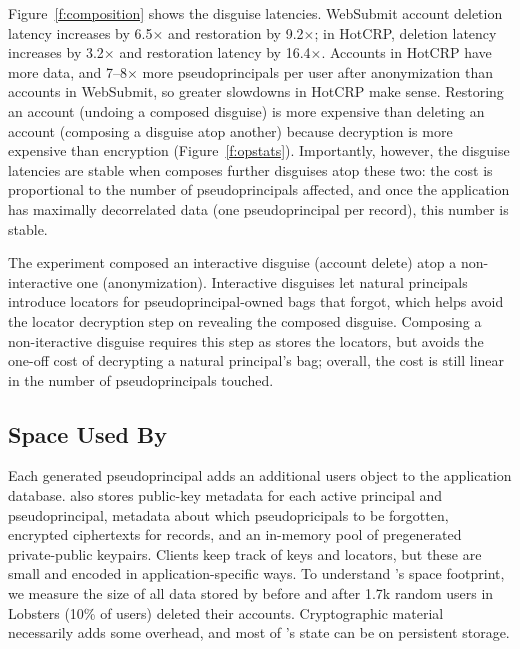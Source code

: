 Figure~\ref{f:composition} shows the disguise latencies.
%
WebSubmit account deletion latency increases by 6.5$\times$ and restoration by 9.2$\times$; in
HotCRP, deletion latency increases by 3.2$\times$ and restoration latency by 16.4$\times$.
%
Accounts in HotCRP have more data, and 7--8$\times$ more pseudoprincipals per user after
anonymization than accounts in WebSubmit, so greater slowdowns in HotCRP make sense.
%
Restoring an account (\ie undoing a composed disguise) is more expensive than deleting an
account (\ie composing a disguise atop another) because decryption is more expensive than
encryption (Figure~\ref{f:opstats}).
%
Importantly, however, the disguise latencies are stable when \sys composes further
disguises atop these two: the cost is proportional to the number of pseudoprincipals
affected, and once the application has maximally decorrelated data (\ie one pseudoprincipal
per record), this number is stable.
%

%
The experiment composed an interactive disguise (account delete) atop a
non-interactive one (anonymization).
%
Interactive disguises let natural principals introduce locators for
pseudoprincipal-owned bags that \sys forgot, which helps avoid the locator
decryption step on revealing the composed disguise.
%
Composing a non-iteractive disguise requires this step as \sys stores the
locators, but avoids the one-off cost of decrypting a natural
principal's bag; overall, the cost is still linear in the number of
pseudoprincipals touched.
%

\subsection{Space Used By \sys}
\label{s:eval-res}

%
Each generated pseudoprincipal adds an additional users object to the application
database.
%
\sys also stores public-key metadata for each active principal and
pseudoprincipal, metadata about which pseudopricipals to be forgotten,
encrypted ciphertexts for records, and an in-memory pool of pregenerated
private-public keypairs.
%
Clients keep track of keys and locators, but these are small and encoded
in application-specific ways.
%
To understand \sys's space footprint, we measure the size of all data stored
by \sys before and after 1.7k random users in Lobsters (10\% of users)
deleted their accounts.
%
Cryptographic material necessarily adds some overhead, and most of \sys's
state can be on persistent storage.
%

